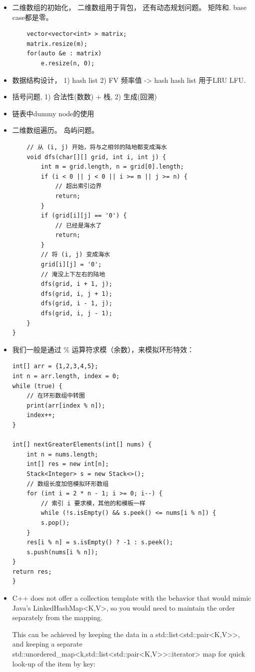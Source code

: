 \documentclass[a4paper,11pt,twoside]{book}
\begin{document}
\begin{itemize}
	\item 二维数组的初始化， 二维数组用于背包， 还有动态规划问题。 矩阵和. base case都是零。

\begin{lstlisting}
	vector<vector<int> > matrix;
	matrix.resize(m);
	for(auto &e : matrix)
		e.resize(n, 0);
\end{lstlisting}

	\item 数据结构设计， 1) hash list 2) FV 频率值 -> hash  hash list 用于LRU LFU. 
	
	\item 括号问题, 1) 合法性(数数) + 栈, 2) 生成(回溯)
	
	\item 链表中dummy node的使用
	
	\item 二维数组遍历。 岛屿问题。
\begin{lstlisting}
	// 从 (i, j) 开始，将与之相邻的陆地都变成海⽔
	void dfs(char[][] grid, int i, int j) {
		int m = grid.length, n = grid[0].length;
		if (i < 0 || j < 0 || i >= m || j >= n) {
			// 超出索引边界
			return;
		}
		if (grid[i][j] == '0') {
			// 已经是海⽔了
			return;
		}
		// 将 (i, j) 变成海⽔
		grid[i][j] = '0';
		// 淹没上下左右的陆地
		dfs(grid, i + 1, j);
		dfs(grid, i, j + 1);
		dfs(grid, i - 1, j);
		dfs(grid, i, j - 1);
	}
}
\end{lstlisting}

\item 我们一般是通过 \% 运算符求模（余数），来模拟环形特效：
\begin{lstlisting}
int[] arr = {1,2,3,4,5};
int n = arr.length, index = 0;
while (true) {
	// 在环形数组中转圈
	print(arr[index % n]);
	index++;
}

int[] nextGreaterElements(int[] nums) {
	int n = nums.length;
	int[] res = new int[n];
	Stack<Integer> s = new Stack<>();
	// 数组长度加倍模拟环形数组
	for (int i = 2 * n - 1; i >= 0; i--) {
		// 索引 i 要求模，其他的和模板一样
		while (!s.isEmpty() && s.peek() <= nums[i % n]) {
		s.pop();
	}
	res[i % n] = s.isEmpty() ? -1 : s.peek();
	s.push(nums[i % n]);
}
return res;
}
\end{lstlisting}

\item C++ does not offer a collection template with the behavior that would mimic Java's LinkedHashMap<K,V>, so you would need to maintain the order separately from the mapping.

This can be achieved by keeping the data in a std::list<std::pair<K,V>>, and keeping a separate std::unordered_map<k,std::list<std::pair<K,V>>::iterator> map for quick look-up of the item by key:


\end{itemize}
\end{document}
